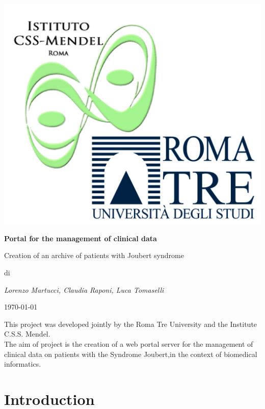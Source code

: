 \documentclass[a4paper]{report}
\begin{document}
\begin{titlepage}
\centering
{}
\includegraphics{logoRomaTre.jpg}\\
{\LARGE \bf Portal for the management of clinical data\par}
\vspace{0.5cm}
{\Large Creation of an archive of patients with Joubert syndrome\par} 
\vspace{2cm}
di\\
{\Large \em Lorenzo Martucci, Claudia Raponi, Luca Tomaselli\par}
\date{\currenttime}
\today
\end{titlepage}

\begin{Large}
This project was developed jointly by the Roma Tre University and the Institute C.S.S. Mendel. \\
The aim of project is the creation of a web portal server for the management of clinical data on patients with the Syndrome Joubert,in the context of biomedical informatics.\\
\end{Large}

\tableofcontents

\part{Introduction}
\end{document}
